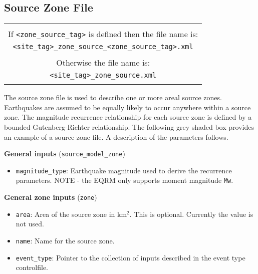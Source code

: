 \subsection{Source Zone File}
\label{sec:source-zone-file}


\begin{center}
\begin{tabular}{|c|}
\hline
 \\
 If \texttt{<zone\_source\_tag>} is defined then the file name is:\\
\texttt{<site\_tag>\_}\texttt{zone\_source\_}\texttt{<zone\_source\_tag>}\texttt{.xml}
\\
\\
Otherwise the file name is:\\
\texttt{<site\_tag>\_}\texttt{zone\_source}\texttt{.xml}\\
\\
\hline
\end{tabular}
\end{center}

The source zone file is used to describe one or more areal source
zones. Earthquakes are assumed to be equally likely to occur
anywhere within a source zone. The magnitude recurrence relationship
for each source zone is defined by a bounded Gutenberg-Richter
relationship. The following grey shaded box provides an example of a
source zone file. A description of the parameters follows.
%


\textbf{General inputs} (\texttt{source\_model\_zone})
\begin{itemize}
\item \texttt{magnitude\_type}: Earthquake magnitude used to derive the
recurrence parameters. NOTE - the EQRM only supports moment magnitude
\texttt{Mw}.
\end{itemize}

\textbf{General zone inputs} (\texttt{zone})
\begin{itemize}
\item \texttt{area}: Area of the source zone in km$^2$.  This is
  optional.  Currently the value is not used.
\item \texttt{name}: Name for the source zone.
\item \texttt{event\_type}: Pointer to the collection of inputs described in the
event type controlfile.
\end{itemize}

